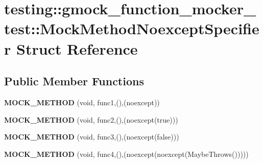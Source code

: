 \hypertarget{structtesting_1_1gmock__function__mocker__test_1_1MockMethodNoexceptSpecifier}{}\section{testing\+:\+:gmock\+\_\+function\+\_\+mocker\+\_\+test\+:\+:Mock\+Method\+Noexcept\+Specifier Struct Reference}
\label{structtesting_1_1gmock__function__mocker__test_1_1MockMethodNoexceptSpecifier}
\subsection*{Public Member Functions}
\begin{DoxyCompactItemize}
\item 
\mbox{\label{structtesting_1_1gmock__function__mocker__test_1_1MockMethodNoexceptSpecifier_a0b4fa874c567e5a4db0b09e0579de22f}} 
{\bfseries M\+O\+C\+K\+\_\+\+M\+E\+T\+H\+OD} (void, func1,(),(noexcept))
\item 
\mbox{\label{structtesting_1_1gmock__function__mocker__test_1_1MockMethodNoexceptSpecifier_a1093f1d823fc4d278ea551252333bf85}} 
{\bfseries M\+O\+C\+K\+\_\+\+M\+E\+T\+H\+OD} (void, func2,(),(noexcept(true)))
\item 
\mbox{\label{structtesting_1_1gmock__function__mocker__test_1_1MockMethodNoexceptSpecifier_aed8d1d4eed943e018d48415b3eb76ba6}} 
{\bfseries M\+O\+C\+K\+\_\+\+M\+E\+T\+H\+OD} (void, func3,(),(noexcept(false)))
\item 
\mbox{\label{structtesting_1_1gmock__function__mocker__test_1_1MockMethodNoexceptSpecifier_a03de3ba1e6571375b607eb16225881eb}} 
{\bfseries M\+O\+C\+K\+\_\+\+M\+E\+T\+H\+OD} (void, func4,(),(noexcept(noexcept(Maybe\+Throws()))))
\item 
\mbox{\label{structtesting_1_1gmock__function__mocker__test_1_1MockMethodNoexceptSpecifier_a4e5e742bdc983a6daccabfbfe60b4f1f}} 

\end{DoxyCompactItemize}
